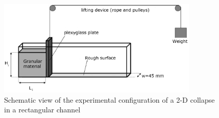 \begin{figure}[tbhp]
\centering
\includegraphics[width=0.85\textwidth]{experiment_setup}
\caption{Schematic view of the experimental configuration of a 2-D collapse in 
a rectangular channel~\citep{Lajeunesse2004}}
\label{fig:exp}
\end{figure}


